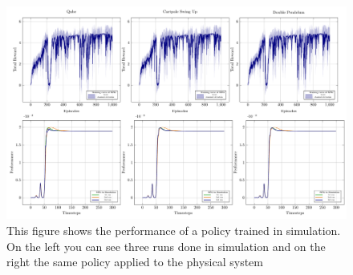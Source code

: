 \begin{figure}
\centering
\includegraphics[scale=.4]{plots/learned_benchmarked_NPG.pdf}
\caption{This figure shows the performance of a policy trained in simulation. On the left you can see three runs done in simulation and on the right the same policy applied to the physical system}
\label{fig:NES_training}
\end{figure}

